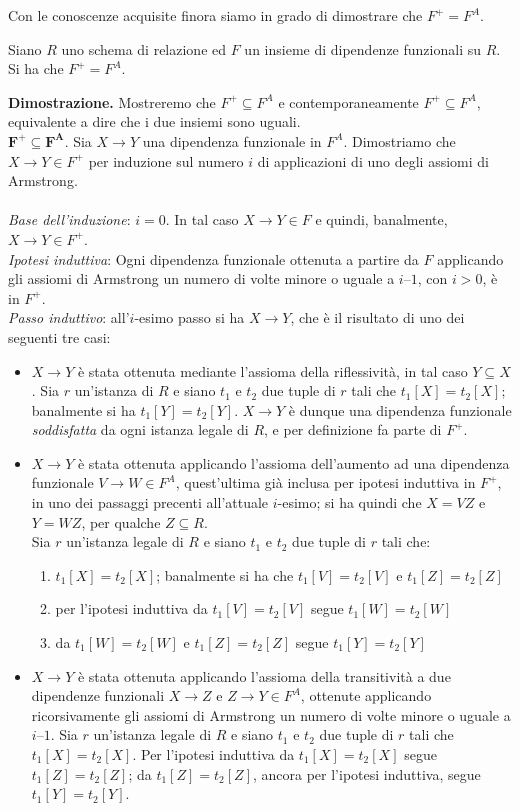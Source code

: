 Con le conoscenze acquisite finora siamo in grado di dimostrare che $F^+ = F^A$.
\begin{theo}
Siano $R$ uno schema di relazione ed $F$ un insieme di dipendenze funzionali su $R$. Si ha che $F^+ = F^A$.
\end{theo}
\textbf{Dimostrazione.} Mostreremo che $F^+ \subseteq F^A$ e contemporaneamente $F^+ \subseteq F^A$, equivalente
a dire che i due insiemi sono uguali.\\
$\mathbf{F^{\boldsymbol{+}} \boldsymbol{\subseteq} F^A}$. Sia $X \rightarrow Y$ una dipendenza funzionale in $F^A$.
Dimostriamo che $X\rightarrow Y \in F^+$ per induzione sul numero $i$ di applicazioni di uno degli assiomi di Armstrong.\\\\
\emph{Base dell’induzione}: $i=0$. In tal caso $X \rightarrow Y \in F$ e quindi, banalmente, 
$X \rightarrow Y \in F^+$.\\
\emph{Ipotesi induttiva}: Ogni dipendenza funzionale ottenuta a partire da $F$ applicando gli assiomi di 
Armstrong un numero di volte minore o uguale a $i–1$, con $i>0$, è in $F^+$.\\
\emph{Passo induttivo}: all'$i$-esimo passo si ha $X \rightarrow Y$, che è il risultato di uno dei seguenti 
tre casi:
\begin{itemize}
 \item  $X \rightarrow Y$ è stata ottenuta mediante l’assioma della riflessività, in tal caso $Y \subseteq X$. 
 Sia $r$ un’istanza di $R$ e siano $t_1$ e $t_2$ due tuple di $r$ tali che $t_1[X]=t_2[X]$; banalmente si ha 
 $t_1[Y] = t_2[Y]$. $X \rightarrow Y$ è dunque una dipendenza funzionale \emph{soddisfatta} da ogni istanza legale
 di $R$, e per definizione fa parte di $F^+$.
 \item $X \rightarrow Y$ è stata ottenuta applicando l’assioma dell’aumento ad una dipendenza funzionale 
 $V \rightarrow W \in F^A$, quest'ultima già inclusa per ipotesi induttiva in $F^+$, in uno dei passaggi 
 precenti all'attuale $i$-esimo; si ha quindi che $X = VZ$ e $Y = WZ$, per qualche $Z \subseteq R$.\\
 Sia $r$ un’istanza legale di $R$ e siano $t_1$ e $t_2$ due tuple di $r$ tali che:
 \begin{enumerate}
  \item $t_1[X] = t_2[X]$; banalmente si ha che $t_1[V] = t_2[V]$ e $t_1[Z] = t_2[Z]$
  \item per l’ipotesi induttiva da $t_1[V] = t_2[V]$ segue $t_1[W] = t_2[W]$
  \item da $t_1[W] = t_2[W]$ e $t_1[Z] = t_2[Z]$ segue $t_1[Y] = t_2[Y]$
 \end{enumerate}
\item $X \rightarrow Y$ è stata ottenuta applicando l’assioma della transitività a due dipendenze funzionali 
$X \rightarrow Z$ e $Z \rightarrow Y \in F^A$, ottenute applicando ricorsivamente gli assiomi di Armstrong 
un numero di volte minore o uguale a $i–1$. Sia $r$ un’istanza legale di $R$ e siano $t_1$ e $t_2$ due tuple 
di $r$ tali che $t_1[X] = t_2[X]$. Per l’ipotesi induttiva da $t_1[X] = t_2[X]$ segue $t_1[Z] = t_2[Z]$; da 
$t_1[Z] = t_2[Z]$, ancora per l’ipotesi induttiva, segue $t_1[Y] = t_2[Y]$.
\end{itemize}
